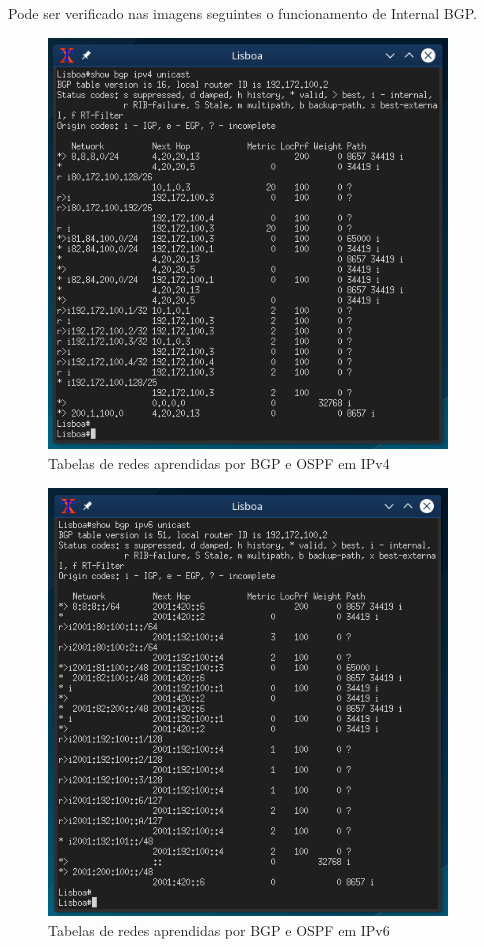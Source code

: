 \documentclass[11pt,a4paper]{report}
\begin{document}
Pode ser verificado nas imagens seguintes o funcionamento de Internal BGP.

\begin{figure}[H]
\centerline{\includegraphics[width=300pt]{lisboa_bgp_ipv4.png}}
\caption{Tabelas de redes aprendidas por BGP e OSPF em IPv4}
\label{schema}
\end{figure}

\begin{figure}[H]
\centerline{\includegraphics[width=300pt]{lisboa_bgp_ipv6.png}}
\caption{Tabelas de redes aprendidas por BGP e OSPF em IPv6}
\label{schema}
\end{figure}
\end{document}
